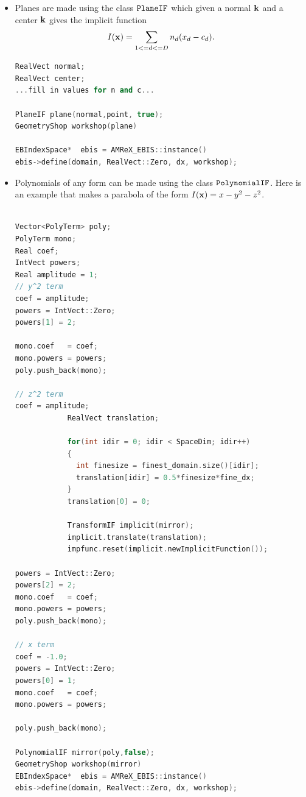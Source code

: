 \begin{itemize}

\item Planes are made using the class $\tt{PlaneIF}$ which given a normal
${\bf k}$  and a center ${\bf k}$ gives the implicit function 
$$
I({\bf x}) = \sum_{1<=d<=D} n_d (x_d - c_d).
$$

\begin{lstlisting}[language=cpp]
RealVect normal; 
RealVect center;
...fill in values for n and c...

PlaneIF plane(normal,point, true);
GeometryShop workshop(plane)

EBIndexSpace*  ebis = AMReX_EBIS::instance()
ebis->define(domain, RealVect::Zero, dx, workshop);

\end{lstlisting}

\item Polynomials of any form can be made using the class
  $\tt{PolynomialIF}$.  Here is an example that makes a parabola of
  the form $I({\bf x}) = x - y^2 - z^2$. 
\begin{lstlisting}[language=cpp]

Vector<PolyTerm> poly;
PolyTerm mono;
Real coef;
IntVect powers;
Real amplitude = 1;
// y^2 term
coef = amplitude;
powers = IntVect::Zero;
powers[1] = 2;

mono.coef   = coef;
mono.powers = powers;
poly.push_back(mono);

// z^2 term
coef = amplitude;
            RealVect translation;
      
            for(int idir = 0; idir < SpaceDim; idir++)
            {
              int finesize = finest_domain.size()[idir];
              translation[idir] = 0.5*finesize*fine_dx;
            }
            translation[0] = 0;

            TransformIF implicit(mirror);
            implicit.translate(translation);
            impfunc.reset(implicit.newImplicitFunction());

powers = IntVect::Zero;
powers[2] = 2;
mono.coef   = coef;
mono.powers = powers;
poly.push_back(mono);

// x term
coef = -1.0;
powers = IntVect::Zero;
powers[0] = 1;
mono.coef   = coef;
mono.powers = powers;

poly.push_back(mono);

PolynomialIF mirror(poly,false);
GeometryShop workshop(mirror)
EBIndexSpace*  ebis = AMReX_EBIS::instance()
ebis->define(domain, RealVect::Zero, dx, workshop);
\end{lstlisting}

\end{itemize}
